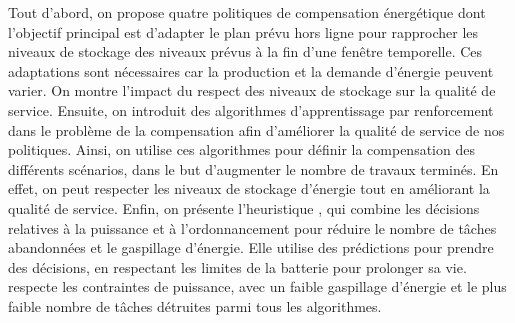 Tout d'abord, on propose quatre politiques de compensation énergétique dont l'objectif principal est d'adapter le plan prévu hors ligne pour rapprocher les niveaux de stockage des niveaux prévus à la fin d'une fenêtre temporelle. Ces adaptations sont nécessaires car la production et la demande d'énergie peuvent varier. On montre l'impact du respect des niveaux de stockage sur la qualité de service. Ensuite, on introduit des algorithmes d'apprentissage par renforcement dans le problème de la compensation afin d'améliorer la qualité de service de nos politiques. Ainsi, on utilise ces algorithmes pour définir la compensation des différents scénarios, dans le but d'augmenter le nombre de travaux terminés. En effet, on peut respecter les niveaux de stockage d'énergie tout en améliorant la qualité de service. Enfin, on présente l'heuristique \emph{\systemName}, qui combine les décisions relatives à la puissance et à l'ordonnancement pour réduire le nombre de tâches abandonnées et le gaspillage d'énergie. Elle utilise des prédictions pour prendre des décisions, en respectant les limites de la batterie pour prolonger sa vie. \emph{\systemName} respecte les contraintes de puissance, avec un faible gaspillage d'énergie et le plus faible nombre de tâches détruites parmi tous les algorithmes.
